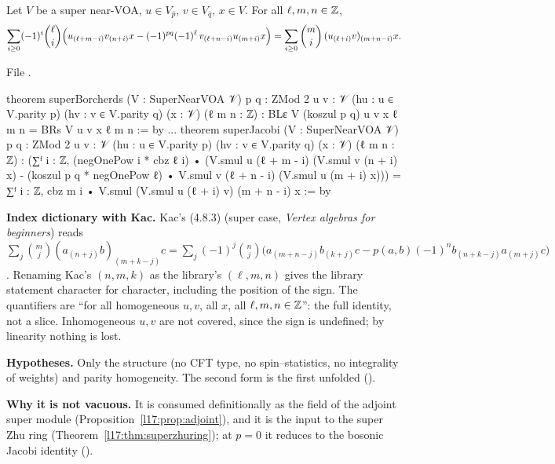 \begin{theorem}\label{l17:thm:superjacobi}
Let $V$ be a super near-VOA, $u\in V_{\bar p}$, $v\in V_{\bar q}$, $x\in V$. For all $\ell,m,n\in{\mathbb{Z}}$,
\begin{equation*}
\sum_{i\ge0}(-1)^i\binom{\ell}{i}\Bigl(u_{(\ell+m-i)}v_{(n+i)}x
-(-1)^{pq}(-1)^\ell\,v_{(\ell+n-i)}u_{(m+i)}x\Bigr)
=\sum_{i\ge0}\binom mi\,(u_{(\ell+i)}v)_{(m+n-i)}x .
\end{equation*}
\end{theorem}
\noindent File .
\begin{leancode}
theorem superBorcherds (V : SuperNearVOA 𝒱) {p q : ZMod 2} {u v : 𝒱} (hu : u ∈ V.parity p)
    (hv : v ∈ V.parity q) (x : 𝒱) (ℓ m n : ℤ) :
    BLε V (koszul p q) u v x ℓ m n = BRs V u v x ℓ m n := by
...
theorem superJacobi (V : SuperNearVOA 𝒱) {p q : ZMod 2} {u v : 𝒱} (hu : u ∈ V.parity p)
    (hv : v ∈ V.parity q) (x : 𝒱) (ℓ m n : ℤ) :
    (∑ᶠ i : ℤ, (negOnePow i * cbz ℓ i) •
        (V.smul u (ℓ + m - i) (V.smul v (n + i) x)
          - (koszul p q * negOnePow ℓ) • V.smul v (ℓ + n - i) (V.smul u (m + i) x)))
      = ∑ᶠ i : ℤ, cbz m i • V.smul (V.smul u (ℓ + i) v) (m + n - i) x := by
\end{leancode}
\begin{dictionary}
\textbf{Index dictionary with Kac.} Kac's (4.8.3) (super case, \emph{Vertex algebras for
beginners}) reads
$\sum_j\binom mj(a_{(n+j)}b)_{(m+k-j)}c=\sum_j(-1)^j\binom nj\bigl(a_{(m+n-j)}b_{(k+j)}c-p(a,b)(-1)^nb_{(n+k-j)}a_{(m+j)}c\bigr)$.
Renaming Kac's $(n,m,k)$ as the library's $(\ell,m,n)$ gives the library statement character for
character, including the position of the sign. The quantifiers are ``for all homogeneous $u,v$, all
$x$, all $\ell,m,n\in{\mathbb{Z}}$'': the full identity, not a slice. Inhomogeneous $u,v$ are not covered,
since the sign is undefined; by linearity nothing is lost.

\textbf{Hypotheses.} Only the structure  (no CFT type, no spin--statistics, no
integrality of weights) and parity homogeneity. The second form is the first unfolded
().

\textbf{Why it is not vacuous.} It is consumed definitionally as the  field of the adjoint
super module (Proposition~\ref{l17:prop:adjoint}), and it is the input to the super Zhu ring
(Theorem~\ref{l17:thm:superzhuring}); at $p=0$ it reduces to the bosonic Jacobi identity
().
\end{dictionary}
